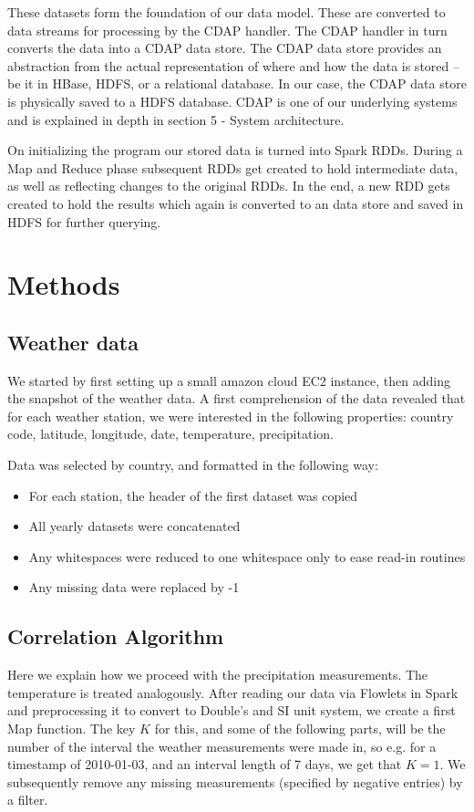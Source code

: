\documentclass[
10pt, %
a4paper, %
oneside, %
headinclude,footinclude, %
useAMS,
usenatbib
]{mn2e}  %
\begin{document}
These datasets form the foundation of our data model. These are converted to data streams for processing by the CDAP handler. The CDAP handler in turn converts the data into a CDAP data store. The CDAP data store provides an abstraction from the actual representation of where and how the data is stored – be it in HBase, HDFS, or a relational database. In our case, the CDAP data store is physically saved to a HDFS database. CDAP is one of our underlying systems and is explained in depth in section 5 - System architecture.

On initializing the program our stored data is turned into Spark RDDs. During a Map and Reduce phase subsequent RDDs get created to hold intermediate data, as well as reflecting changes to the original RDDs. In the end, a new RDD gets created to hold the results which again is converted to an data store and saved in HDFS for further querying.


\section{Methods}
\subsection{Weather data}
We started by first setting up a small amazon cloud EC2 instance, then adding the snapshot of the weather data. A first comprehension of the data revealed that for each weather station, we were interested in the following properties: country code, latitude, longitude, date, temperature, precipitation.

Data was selected by country, and formatted in the following way:

\begin{itemize}
    \item For each station, the header of the first dataset was copied
    \item All yearly datasets were concatenated
    \item Any whitespaces were reduced to one whitespace only to ease read-in routines
    \item Any missing data were replaced by -1
\end{itemize}


\subsection{Correlation Algorithm}
\label{sec:cor}
Here we explain how we proceed with the precipitation measurements. The temperature is treated analogously.  After reading our data via Flowlets in Spark and preprocessing it to convert to Double’s and SI unit system, we create a first Map function. The key $K$ for this, and some of the following parts, will be the number of the interval the weather measurements were made in, so e.g. for a timestamp of 2010-01-03, and an interval length of 7 days, we get that $K=1$. We subsequently remove any missing measurements (specified by negative entries) by a filter.
\end{document}

